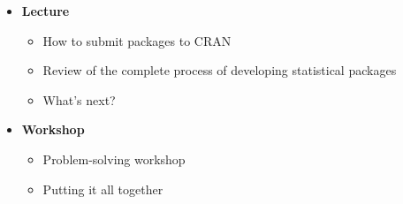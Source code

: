 \documentclass{article}
\begin{document}
\begin{itemize}

	\item {\bf Lecture}
		\begin{itemize}
		  \item How to submit packages to CRAN
		  \item Review of the complete process of developing statistical packages
		  \item What's next?
		\end{itemize}
		
	\item {\bf Workshop}
		\begin{itemize}
		  \item Problem-solving workshop
		  \item Putting it all together
		\end{itemize}
	
\end{itemize}
\end{document}
